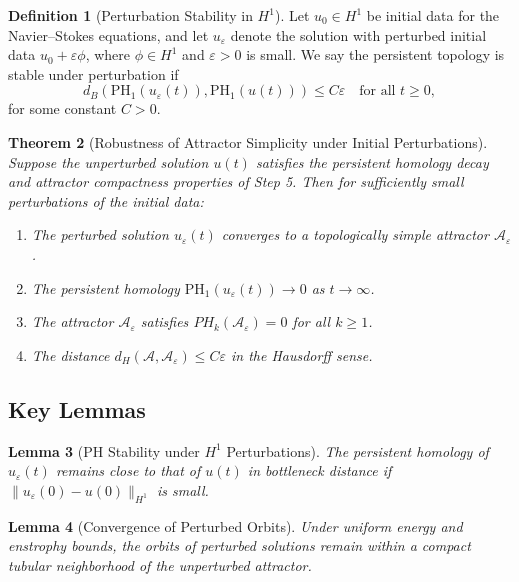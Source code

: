 \documentclass[11pt]{article}
\newtheorem{theorem}{Theorem}[section]
\newtheorem{lemma}[theorem]{Lemma}
\theoremstyle{definition}
\newtheorem{definition}[theorem]{Definition}
\begin{document}
\begin{definition}[Perturbation Stability in $H^1$]
Let $u_0 \in H^1$ be initial data for the Navier--Stokes equations, and let $u_\varepsilon$ denote the solution with perturbed initial data $u_0 + \varepsilon \phi$, where $\phi \in H^1$ and $\varepsilon > 0$ is small. We say the persistent topology is stable under perturbation if
\[
d_B(\mathrm{PH}_1(u_\varepsilon(t)), \mathrm{PH}_1(u(t))) \leq C\varepsilon \quad \text{for all } t \ge 0,
\]
for some constant $C > 0$.
\end{definition}

\begin{theorem}[Robustness of Attractor Simplicity under Initial Perturbations]
\label{thm:perturb_stability}
Suppose the unperturbed solution $u(t)$ satisfies the persistent homology decay and attractor compactness properties of Step 5. Then for sufficiently small perturbations of the initial data:
\begin{enumerate}
  \item The perturbed solution $u_\varepsilon(t)$ converges to a topologically simple attractor $\mathcal{A}_\varepsilon$.
  \item The persistent homology $\mathrm{PH}_1(u_\varepsilon(t)) \to 0$ as $t \to \infty$.
  \item The attractor $\mathcal{A}_\varepsilon$ satisfies $PH_k(\mathcal{A}_\varepsilon) = 0$ for all $k \ge 1$.
  \item The distance $d_H(\mathcal{A}, \mathcal{A}_\varepsilon) \leq C\varepsilon$ in the Hausdorff sense.
\end{enumerate}
\end{theorem}

\subsection*{Key Lemmas}

\begin{lemma}[PH Stability under $H^1$ Perturbations]
The persistent homology of $u_\varepsilon(t)$ remains close to that of $u(t)$ in bottleneck distance if $\|u_\varepsilon(0) - u(0)\|_{H^1}$ is small.
\end{lemma}

\begin{lemma}[Convergence of Perturbed Orbits]
Under uniform energy and enstrophy bounds, the orbits of perturbed solutions remain within a compact tubular neighborhood of the unperturbed attractor.
\end{lemma}
\end{document}
